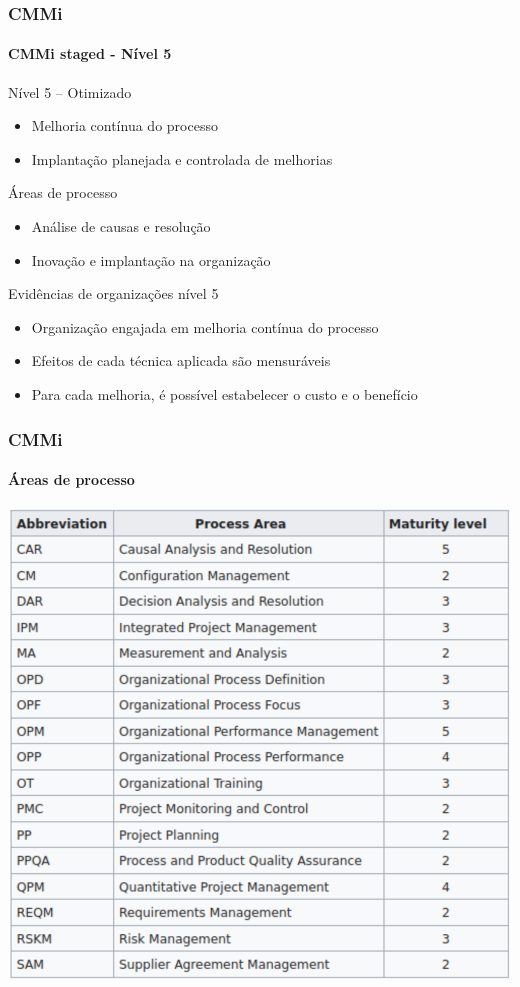\begin{frame}
	\frametitle{CMMi}
	\framesubtitle{CMMi staged - Nível 5}
	
	\begin{block:fact}{Nível 5 -- Otimizado}
		\begin{itemize}
			\item Melhoria contínua do processo
			\item Implantação planejada e controlada de melhorias
		\end{itemize}
	\end{block:fact}
	
	\begin{block:fact}{Áreas de processo}
		\begin{itemize}
			\item Análise de causas e resolução
			\item Inovação e implantação na organização
		\end{itemize}
	\end{block:fact}


	\begin{block:fact}{Evidências de organizações nível 5}
		\begin{itemize}
			\item Organização engajada em melhoria contínua do processo
			\item Efeitos de cada técnica aplicada são mensuráveis
			\item Para cada melhoria, é possível estabelecer o custo e o benefício
		\end{itemize}
	\end{block:fact}
\end{frame}

\begin{frame}
	\frametitle{CMMi}
	\framesubtitle{Áreas de processo}
	
	\begin{block:fact}{}
		\centering
		\includegraphics[width=.8\textwidth]{software-engineering/project-management/process/process-quality/cmmi/cmmi-pa}

	\end{block:fact}
\end{frame}


